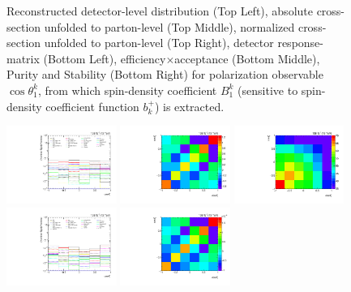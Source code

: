 \begin{figure}[htb]
\begin{center}
\caption{Reconstructed detector-level distribution (Top Left), absolute cross-section unfolded to parton-level (Top Middle), normalized cross-section unfolded to parton-level (Top Right), detector response-matrix (Bottom Left), efficiency$\times$acceptance (Bottom Middle), Purity and Stability (Bottom Right) for polarization observable $\cos\theta_{1}^{k}$, from which spin-density coefficient $B_{1}^{k}$ (sensitive to spin-density coefficient function $b_k^{+}$) is extracted.}
\label{fig:b1k}
\end{center}
\end{figure}
\clearpage
\begin{figure}[htb]
\begin{center}
 \includegraphics[width=0.32\textwidth]{fig_fullRun2UL/unfolding/combined/deltaSystCombinedlog_rebinnedB_b1k.pdf}
 \includegraphics[width=0.32\textwidth]{fig_fullRun2UL/unfolding/combined/StatCovMatrix_rebinnedB_b1k.pdf}
 \includegraphics[width=0.32\textwidth]{fig_fullRun2UL/unfolding/combined/TotalSystCovMatrix_rebinnedB_b1k.pdf} \\
 \includegraphics[width=0.32\textwidth]{fig_fullRun2UL/unfolding/combined/deltaSystCombinedlogNorm_rebinnedB_b1k.pdf}
 \includegraphics[width=0.32\textwidth]{fig_fullRun2UL/unfolding/combined/StatCovMatrixNorm_rebinnedB_b1k.pdf}

\end{center}
\end{figure}
